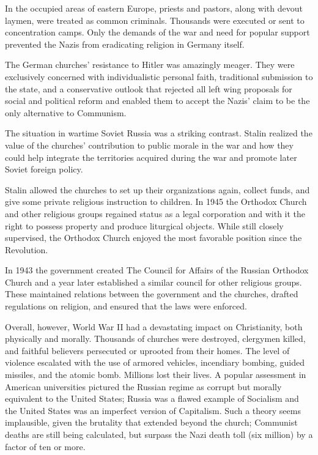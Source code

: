 In the occupied areas of eastern Europe, priests and pastors, along with devout laymen, were treated
as common criminals. Thousands were executed or sent to concentration camps. Only the demands of the
war and need for popular support prevented the Nazis from eradicating religion in Germany itself.

The German churches’ resistance to Hitler was amazingly meager. They were exclusively concerned with
individualistic personal faith, traditional submission to the state, and a conservative outlook that
rejected all left wing proposals for social and political reform and enabled them to accept the
Nazis’ claim to be the only alternative to Communism.

The situation in wartime Soviet Russia was a striking contrast. Stalin realized the value of the
churches’ contribution to public morale in the war and how they could help integrate the territories
acquired during the war and promote later Soviet foreign policy.

Stalin allowed the churches to set up their organizations again, collect funds, and give some
private religious instruction to children. In 1945 the Orthodox Church and other religious groups
regained status as a legal corporation and with it the right to possess property and produce
liturgical objects. While still closely supervised, the Orthodox Church enjoyed the most favorable
position since the Revolution.

In 1943 the government created The Council for Affairs of the Russian Orthodox Church and a year
later established a similar council for other religious groups. These maintained relations between
the government and the churches, drafted regulations on religion, and ensured that the laws were
enforced.

Overall, however, World War II had a devastating impact on Christianity, both physically and
morally. Thousands of churches were destroyed, clergymen killed, and faithful believers persecuted
or uprooted from their homes. The level of violence escalated with the use of armored vehicles,
incendiary bombing, guided missiles, and the atomic bomb. Millions lost their lives. A popular
assessment in American universities pictured the Russian regime as corrupt but morally equivalent to
the United States; Russia was a flawed example of Socialism and the United States was an imperfect
version of Capitalism. Such a theory seems implausible, given the brutality that extended beyond the
church; Communist deaths are still being calculated, but surpass the Nazi death toll (six million)
by a factor of ten or more.

